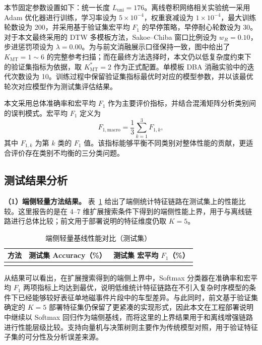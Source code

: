本节固定参数设置如下：统一长度 $L_{\mathrm{uni}}=176$。离线卷积网络相关实验统一采用 Adam 优化器进行训练，学习率设为 $5\times10^{-4}$，权重衰减设为 $1\times10^{-4}$，最大训练轮数设为 200，并采用基于验证集宏平均 $F_1$ 的早停策略，早停耐心轮数设为 30。对于本文最终采用的 DTW 多模板方法，Sakoe--Chiba 窗口比例设为 $w_R=0.10$，步进惩罚项设为 $\lambda=0.00$。为与前文消融展示口径保持一致，图中给出了 $K_{\mathrm{MT}}=1\sim 6$ 的完整参考扫描；而在最终方法选择时，本文仍以低复杂度约束下的验证集指标为依据，取 $K_{\mathrm{MT}}^\ast=2$ 作为正式配置。单模板 DBA 消融实验中的迭代次数设为 10。训练过程中保留验证集指标最优时对应的模型参数，并以该最优轮次对应模型作为测试集评估结果。

本文采用总体准确率和宏平均 $F_1$ 作为主要评价指标，并结合混淆矩阵分析类别间的误判模式。宏平均 $F_1$ 定义为
\begin{equation}
    F_{1,\mathrm{macro}}=\frac{1}{3}\sum_{k=1}^{3}F_{1,k},
\end{equation}
其中 $F_{1,k}$ 为第 $k$ 类的 $F_1$ 值。该指标能够平衡不同类别对整体性能的贡献，更适合评价存在类别不均衡的三分类问题。

\subsection{测试结果分析}
\label{subsec:ch3_exp_result}

\textbf{（1）端侧轻量方法结果。}
表~\ref{tab:ch3_edge} 给出了端侧统计特征链路在测试集上的性能比较。这里报告的是在 4--7 维扩展搜索条件下得到的端侧性能上界，用于与离线链路进行总体比较；前文用于部署说明的特征维度仍取 $K=5$。

\begin{table}[!htbp]
\centering
\small
\caption{端侧轻量基线性能对比（测试集）}
\label{tab:ch3_edge}
\begin{tabular}{lcc}
\hline
方法 & 测试集 Accuracy（\%） & 测试集 宏平均 $F_1$（\%） \\
\hline
\\
\hline
\end{tabular}
\end{table}

从结果可以看出，在扩展搜索得到的端侧上界中，Softmax 分类器在准确率和宏平均 $F_1$ 两项指标上均达到最优，说明低维统计特征链路在不引入复杂时序模型的条件下已经能够较好表征单地磁事件片段中的车型差异。与此同时，前文基于验证集确定的 $K=5$ 部署特征集仍保留了更紧凑的实现形式，因此本文在工程部署说明中继续以 Softmax 回归作为端侧基线，而将这里的上界结果用于和离线增强链路进行性能层级比较。支持向量机与决策树则主要作为传统模型对照，用于验证特征子集的可分性及分析误差来源。

